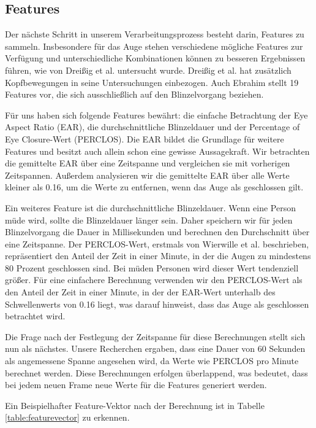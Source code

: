 \subsection{Features}
\label{sec:features}

Der nächste Schritt in unserem Verarbeitungsprozess besteht darin, Features zu sammeln. Insbesondere für das Auge stehen verschiedene mögliche Features zur Verfügung und unterschiedliche Kombinationen können zu besseren Ergebnissen führen, wie von Dreißig et al. \cite{DREI} untersucht wurde. Dreißig et al. hat zusätzlich Kopfbewegungen in seine Untersuchungen einbezogen. Auch Ebrahim \cite{EB16} stellt 19 Features vor, die sich ausschließlich auf den Blinzelvorgang beziehen.

Für uns haben sich folgende Features bewährt: die einfache Betrachtung der \glqq Eye Aspect Ratio\grqq{} (EAR), die durchschnittliche Blinzeldauer und der \glqq Percentage of Eye Closure\grqq{}-Wert (PERCLOS). Die EAR bildet die Grundlage für weitere Features und besitzt auch allein schon eine gewisse Aussagekraft. Wir betrachten die gemittelte EAR über eine Zeitspanne und vergleichen sie mit vorherigen Zeitspannen. Außerdem analysieren wir die gemittelte EAR über alle Werte kleiner als 0.16, um die Werte zu entfernen, wenn das Auge als geschlossen gilt.

Ein weiteres Feature ist die durchschnittliche Blinzeldauer. Wenn eine Person müde wird, sollte die Blinzeldauer länger sein. Daher speichern wir für jeden Blinzelvorgang die Dauer in Millisekunden und berechnen den Durchschnitt über eine Zeitspanne.
Der PERCLOS-Wert, erstmals von Wierwille et al. \cite{WI94} beschrieben, repräsentiert den Anteil der Zeit in einer Minute, in der die Augen zu mindestens 80 Prozent geschlossen sind. Bei müden Personen wird dieser Wert tendenziell größer. Für eine einfachere Berechnung verwenden wir den PERCLOS-Wert als den Anteil der Zeit in einer Minute, in der der EAR-Wert unterhalb des Schwellenwerts von 0.16 liegt, was darauf hinweist, dass das Auge als geschlossen betrachtet wird.

Die Frage nach der Festlegung der Zeitspanne für diese Berechnungen stellt sich nun als nächstes. Unsere Recherchen ergaben, dass eine Dauer von 60 Sekunden als angemessene Spanne angesehen wird, da Werte wie PERCLOS pro Minute berechnet werden. Diese Berechnungen erfolgen überlappend, was bedeutet, dass bei jedem neuen Frame neue Werte für die Features generiert werden.

Ein Beispielhafter Feature-Vektor nach der Berechnung ist in Tabelle \ref{table:featurevector} zu erkennen.

